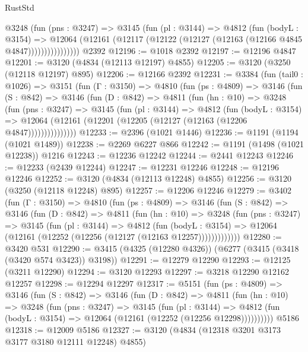 \begin{lexlean}{RustStd}
\begin{coremodule}
{\begin{coremodule}
{{{{{{{{{{{{{{{{{{{{{{{{{{                @3248
                  (fun (pns : @3247) =>
                  @3145
                    (fun (pl : @3144) =>
                    @4812
                      (fun (bodyL : @3154) =>
                      @12064
                        (@12161 (@12117 (@12122 (@12127 (@12163 (@12166 @4845 @4847))))))))))))))))
    @2392
@12196 := @1018 @2392
@12197 := @12196 @4847
@12201 := @3120 (@4834 (@12113 @12197) @4855)
@12205 := @3120 (@3250 (@12118 @12197) @895)
@12206 := @12166 @2392
@12231 := @3384
    (fun (tail0 : @1026) =>
    @3151
      (fun (Γ : @3150) =>
      @4810
        (fun (ps : @4809) =>
        @3146
          (fun (S : @842) =>
          @3146
            (fun (D : @842) =>
            @4811
              (fun (hn : @10) =>
              @3248
                (fun (pns : @3247) =>
                @3145
                  (fun (pl : @3144) =>
                  @4812
                    (fun (bodyL : @3154) =>
                    @12064 (@12161 (@12201 (@12205 (@12127 (@12163 (@12206 @4847)))))))))))))))
@12233 := @2396 (@1021 @1446)
@12236 := @1191 (@1194 (@1021 @1489))
@12238 := @2269 @6227 @866
@12242 := @1191 (@1498 (@1021 @12238)) @1216
@12243 := @12236 @12242
@12244 := @2441 @12243
@12246 := @12233 (@2439 @12244)
@12247 := @12231 @12246
@12248 := @12196 @12246
@12252 := @3120 (@4834 (@12113 @12248) @4855)
@12256 := @3120 (@3250 (@12118 @12248) @895)
@12257 := @12206 @12246
@12279 := @3402
    (fun (Γ : @3150) =>
    @4810
      (fun (ps : @4809) =>
      @3146
        (fun (S : @842) =>
        @3146
          (fun (D : @842) =>
          @4811
            (fun (hn : @10) =>
            @3248
              (fun (pns : @3247) =>
              @3145
                (fun (pl : @3144) =>
                @4812
                  (fun (bodyL : @3154) =>
                  @12064 (@12161 (@12252 (@12256 (@12127 (@12163 @12257)))))))))))))
@12280 := @3420 @531
@12290 := @3415 (@4325 (@12280 @4326)) (@6277 (@3415 (@3418 (@3420 @574 @3423)) @3198))
@12291 := @12279 @12290
@12293 := @12125 (@3211 @12290)
@12294 := @3120 @12293
@12297 := @3218 @12290 @12162 @12257
@12298 := @12294 @12297
@12317 := @5151
    (fun (ps : @4809) =>
    @3146
      (fun (S : @842) =>
      @3146
        (fun (D : @842) =>
        @4811
          (fun (hn : @10) =>
          @3248
            (fun (pns : @3247) =>
            @3145
              (fun (pl : @3144) =>
              @4812 (fun (bodyL : @3154) => @12064 (@12161 (@12252 (@12256 @12298))))))))))
    @5186
@12318 := @12009 @5186
@12327 := @3120 (@4834 (@12318 @3201 @3173 @3177 @3180 @12111 @12248) @4855)
}}}}}}}}}}}}}}}}}}}}}}}}}}
\end{coremodule}}
\end{coremodule}
\end{lexlean}
